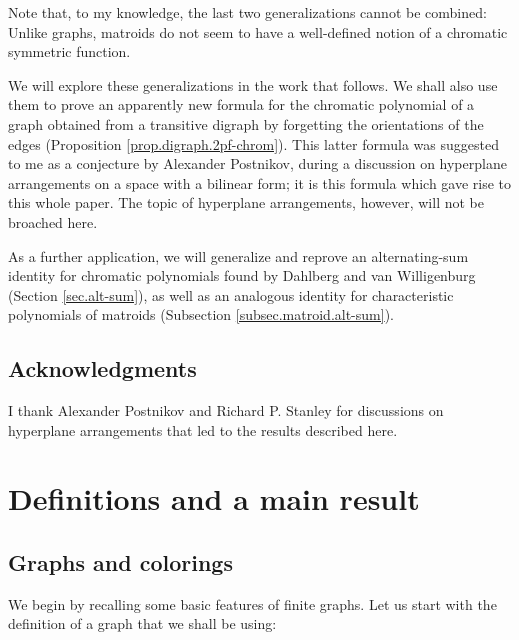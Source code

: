 \documentclass[numbers=enddot,12pt,final,onecolumn,notitlepage]{scrartcl}%
\theoremstyle{definition}
\begin{document}
Note that, to my knowledge, the last two generalizations cannot be combined:
Unlike graphs, matroids do not seem to have a well-defined notion of a
chromatic symmetric function.

We will explore these generalizations in the work that follows. We shall also
use them to prove an apparently new formula for the chromatic polynomial of a
graph obtained from a transitive digraph by forgetting the orientations of the
edges (Proposition \ref{prop.digraph.2pf-chrom}). This latter formula was
suggested to me as a conjecture by Alexander Postnikov, during a discussion on
hyperplane arrangements on a space with a bilinear form; it is this formula
which gave rise to this whole paper. The topic of hyperplane arrangements,
however, will not be broached here.

As a further application, we will generalize and reprove an alternating-sum
identity for chromatic polynomials found by Dahlberg and van Willigenburg
(Section \ref{sec.alt-sum}), as well as an analogous identity for
characteristic polynomials of matroids (Subsection
\ref{subsec.matroid.alt-sum}).

\subsection*{Acknowledgments}

I thank Alexander Postnikov and Richard P. Stanley for discussions on
hyperplane arrangements that led to the results described here.

\section{\label{sec.defs-and-main}Definitions and a main result}

\subsection{Graphs and colorings}

We begin by recalling some basic features of finite graphs. Let us start with
the definition of a graph that we shall be using:
\end{document}
